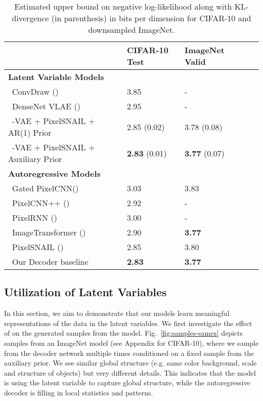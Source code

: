 \documentclass{article} \usepackage{iclr2019_conference,times}
\def\figref#1{figure~\ref{#1}}
\renewcommand{\figref}[1]{Fig.~\ref{#1}}
\begin{document}
\begin{table}[ht]
\centering
\begin{tabular}{@{}l|llll@{}}
          & \textbf{CIFAR-10 Test} & \textbf{ImageNet  Valid}  \\ \hline \textbf{Latent Variable Models} & & \\
\,\,\,ConvDraw (\cite{ConvDraw})                           &   3.85  &  -    \\
\,\,\,DenseNet VLAE (\cite{VLAE})                      &   2.95         &  -    \\
\,\,\,-VAE + PixelSNAIL + AR(1) Prior             &   2.85 (0.02)   &   3.78 (0.08) \\
\,\,\,-VAE + PixelSNAIL + Auxiliary Prior         &   \textbf{2.83} (0.01)  &   \textbf{3.77} (0.07) \\
\hline \textbf{Autoregressive Models} & & \\
\,\,\,Gated PixelCNN(\cite{pixelcnn})     &  3.03         &  3.83    \\
\,\,\,PixelCNN++ (\cite{PixelCNN++})      &  2.92         &  -    \\
\,\,\,PixelRNN   (\cite{PixelRNN})        &  3.00         &  -    \\
\,\,\,ImageTransformer (\cite{ImageTransformer}) &  2.90         &  \textbf{3.77}    \\
\,\,\,PixelSNAIL (\cite{PixelSnail})      &  2.85         &  3.80    \\
\hline
\,\,\,Our Decoder baseline                &  \textbf{2.83} & \textbf{3.77} \\ 

\bottomrule
\end{tabular}
\caption{ Estimated upper bound on negative log-likelihood along with KL-divergence (in parenthesis) in bits per dimension for CIFAR-10 and downsampled ImageNet.}
\label{tbl:nll}
\end{table}


\subsection{Utilization of Latent Variables}
In this section, we aim to demonstrate that our models learn meaningful representations of the data in the latent variables. We first investigate the effect of  on the generated samples from the model. \figref{fig:samples-samez} depicts samples from an ImageNet model (see Appendix for CIFAR-10), where we sample from the decoder network multiple times conditioned on a fixed sample from the auxiliary prior. We see similar global structure (e.g. same color background, scale and structure of objects) but very different details. This indicates that the model is using the latent variable to capture global structure, while the autoregressive decoder is filling in local statistics and patterns.
\end{document}
